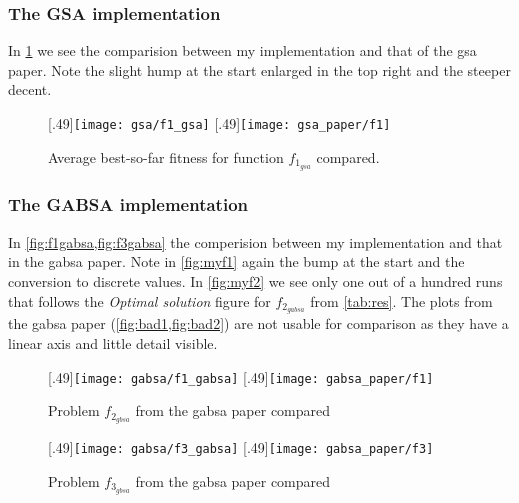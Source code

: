  
 
%
\subsubsection*{The GSA implementation}
In \cref{fig:f1} we see the comparision between my implementation and that of the \ac{gsa} paper. Note the slight hump at the start enlarged in the top right and the steeper decent.
%
\begin{figure}
	\centering
		[.49\linewidth]{\texttt{[image: gsa/f1\_gsa]}}
		[.49\linewidth]{\texttt{[image: gsa\_paper/f1]}}
	\caption{Average best-so-far fitness for function $f_{1_{gsa}}$ compared.}
    \label{fig:f1}
\end{figure}
%
\subsubsection*{The GABSA implementation}
In \cref{fig:f1gabsa,fig:f3gabsa} the comperision between my implementation and that in the \ac{gabsa} paper. Note in \cref{fig:myf1} again the bump at the start and the conversion to discrete values. In \cref{fig:myf2} we see only one out of a hundred runs that follows the \textit{Optimal solution} figure for $f_{2_{gabsa}}$ from \cref{tab:res}. The plots from the \ac{gabsa} paper (\cref{fig:bad1,fig:bad2}) are not usable for comparison as they have a linear axis and little detail visible.
%
\begin{figure}
	\centering
		[.49\linewidth]{\texttt{[image: gabsa/f1\_gabsa]}}
		[.49\linewidth]{\texttt{[image: gabsa\_paper/f1]}}
	\caption{Problem $f_{2_{gbsa}}$ from the \ac{gabsa} paper\cite{GABSA} compared}
    \label{fig:f1gabsa}
\end{figure}
%
\begin{figure}
	\centering
		[.49\linewidth]{\texttt{[image: gabsa/f3\_gabsa]}}
		[.49\linewidth]{\texttt{[image: gabsa\_paper/f3]}}
	\caption{Problem $f_{3_{gbsa}}$ from the \ac{gabsa} paper\cite{GABSA} compared}
    \label{fig:f3gabsa}
\end{figure}
%
